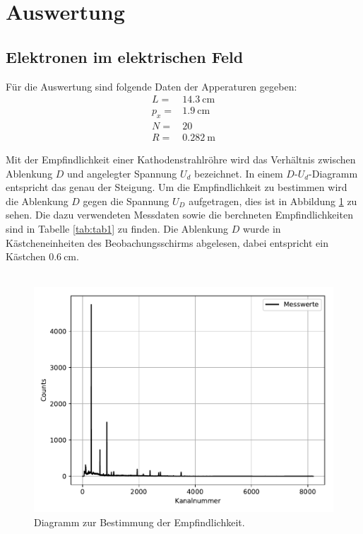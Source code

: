 \section{Auswertung}
\subsection{Elektronen im elektrischen Feld}

\label{sec:Auswertung}
Für die Auswertung sind folgende Daten der Apperaturen gegeben:
\begin{align*}
  L=&\SI{14,3}{\cm} \\
  p_{x}=&\SI{1,9}{\cm}\\
  N=&20    \\
  R=&\SI{0,282}{\m}
\end{align*}

Mit der Empfindlichkeit einer Kathodenstrahlröhre wird das Verhältnis zwischen Ablenkung $D$
und angelegter Spannung $U_d$ bezeichnet. In einem $D\text{-}U_d$-Diagramm entspricht das genau der
Steigung. Um die Empfindlichkeit zu bestimmen wird die Ablenkung $D$ gegen die
Spannung $U_D$ aufgetragen, dies ist in Abbildung \ref{fig:plot1} zu sehen.
Die dazu verwendeten Messdaten sowie die berchneten Empfindlichkeiten
sind in Tabelle \ref{tab:tab1} zu finden. Die Ablenkung $D$ wurde in Kästcheneinheiten
des Beobachungsschirms abgelesen, dabei entspricht ein Kästchen $\SI{0,6}{\cm}$.\\
\\

\begin{figure}
  \centering
  \includegraphics{plot1.pdf}
  \caption{Diagramm zur Bestimmung der Empfindlichkeit.}
  \label{fig:plot1}
\end{figure}

